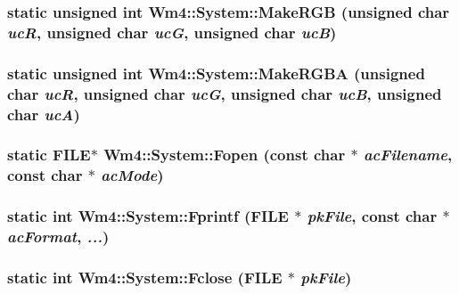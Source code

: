 \subsubsection{\setlength{\rightskip}{0pt plus 5cm}static unsigned int Wm4::System::Make\-RGB (unsigned char {\em uc\-R}, unsigned char {\em uc\-G}, unsigned char {\em uc\-B})\hspace{0.3cm}{\tt  [static]}}\label{classWm4_1_1System_8fca5bb438de73f2f9e179257e874278}


\subsubsection{\setlength{\rightskip}{0pt plus 5cm}static unsigned int Wm4::System::Make\-RGBA (unsigned char {\em uc\-R}, unsigned char {\em uc\-G}, unsigned char {\em uc\-B}, unsigned char {\em uc\-A})\hspace{0.3cm}{\tt  [static]}}\label{classWm4_1_1System_eab6285f19bd417da080e5e0feca3632}


\subsubsection{\setlength{\rightskip}{0pt plus 5cm}static FILE$\ast$ Wm4::System::Fopen (const char $\ast$ {\em ac\-Filename}, const char $\ast$ {\em ac\-Mode})\hspace{0.3cm}{\tt  [static]}}\label{classWm4_1_1System_340806bcae5d85bb9eea6a38f3df84b8}


\subsubsection{\setlength{\rightskip}{0pt plus 5cm}static int Wm4::System::Fprintf (FILE $\ast$ {\em pk\-File}, const char $\ast$ {\em ac\-Format},  {\em ...})\hspace{0.3cm}{\tt  [static]}}\label{classWm4_1_1System_7a8fee165f061ee53c229cb37643574c}


\subsubsection{\setlength{\rightskip}{0pt plus 5cm}static int Wm4::System::Fclose (FILE $\ast$ {\em pk\-File})\hspace{0.3cm}{\tt  [static]}}\label{classWm4_1_1System_fe63864b7d95be12e38287758bc3cbb9}


